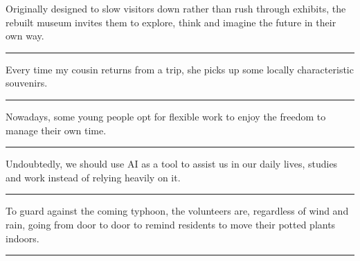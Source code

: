 \documentclass[11pt,a4paper]{article}
\newcommand{\num}[1]{\makebox[1.9em][r]{#1.}\hspace{0.3em}}
\newcommand{\wline}{\noindent\rule{\linewidth}{0.4pt}}
\begin{document}
\begin{minipage}{\linewidth}

\num{4}Originally designed to slow visitors down rather than rush through exhibits, the rebuilt museum invites them to explore, think and imagine the future in their own way.

\vspace{0.25em}

\wline

\end{minipage}

\vspace{0.35em}\vspace{0.15em}

\begin{minipage}{\linewidth}

\num{5}Every time my cousin returns from a trip, she picks up some locally characteristic souvenirs.

\vspace{0.25em}

\wline

\end{minipage}

\begin{minipage}{\linewidth}

\num{6}Nowadays, some young people opt for flexible work to enjoy the freedom to manage their own time.

\vspace{0.25em}

\wline

\end{minipage}

\begin{minipage}{\linewidth}

\num{7}Undoubtedly, we should use AI as a tool to assist us in our daily lives, studies and work instead of relying heavily on it.

\vspace{0.25em}

\wline

\end{minipage}

\begin{minipage}{\linewidth}

\num{8}To guard against the coming typhoon, the volunteers are, regardless of wind and rain, going from door to door to remind residents to move their potted plants indoors.

\vspace{0.25em}

\wline

\end{minipage}
\end{document}

